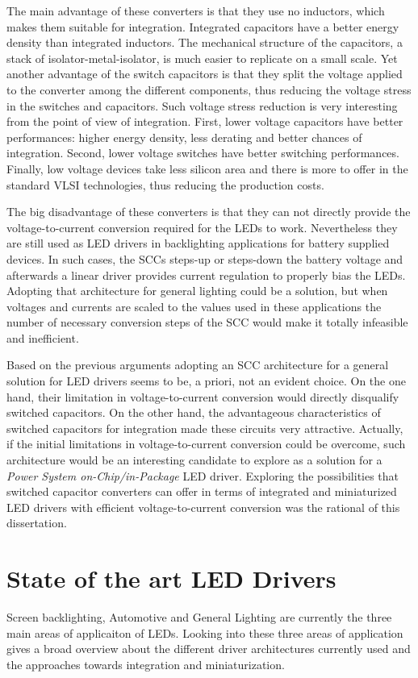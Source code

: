 The main advantage of these converters is that they use no inductors, which makes them suitable for integration. Integrated capacitors have a better energy density than integrated inductors. The mechanical structure of the capacitors, a stack of isolator-metal-isolator, is much easier to replicate on a small scale. Yet another advantage of the switch capacitors is that they split the voltage applied to the converter among the different components, thus reducing the voltage stress in the switches and capacitors. Such voltage stress reduction is very interesting from the point of view of integration. First, lower voltage capacitors have better performances: higher energy density, less derating and better chances of integration. Second, lower voltage switches have better switching performances. Finally, low voltage devices take less silicon area and there is more to offer in the standard VLSI technologies, thus reducing the production costs.

The big disadvantage of these converters is that they can not directly provide the voltage-to-current conversion required for the LEDs to work. Nevertheless they are still used as LED drivers in backlighting applications for battery supplied devices. In such cases, the SCCs steps-up or steps-down the battery voltage and afterwards a linear driver  provides current regulation to properly bias the LEDs. Adopting that architecture for general lighting could be a solution, but when  voltages and currents are scaled to the values used in these applications the number of necessary conversion steps of the SCC would make it totally infeasible and inefficient.

Based on the previous arguments adopting an SCC architecture for a general solution for LED drivers seems to be, a priori,  not an evident choice. On the one hand, their limitation in voltage-to-current conversion would directly disqualify switched capacitors. On the other hand, the advantageous characteristics of switched capacitors for integration made these circuits very attractive. Actually, if the initial limitations in voltage-to-current conversion could be overcome, such architecture would be an interesting candidate to explore as a solution for a \emph{Power System on-Chip/in-Package} LED driver.  Exploring the possibilities that switched capacitor converters can offer in terms of integrated and miniaturized LED drivers with efficient voltage-to-current conversion was the rational of this dissertation.


\section{State of the art LED Drivers}
Screen backlighting, Automotive and General Lighting are currently the three main areas of applicaiton of LEDs. Looking into these three areas of application gives a broad overview about the different driver architectures currently used and the approaches towards integration and miniaturization.

